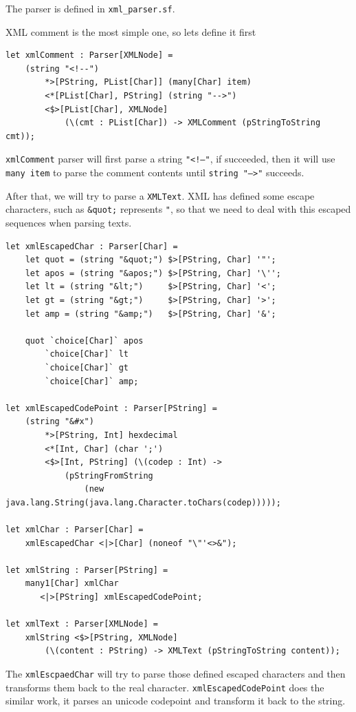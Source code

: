 The parser is defined in \texttt{xml\_parser.sf}.

XML comment is the most simple one, so lets define it first

\begin{lstlisting}
let xmlComment : Parser[XMLNode] =
    (string "<!--")
        *>[PString, PList[Char]] (many[Char] item)
        <*[PList[Char], PString] (string "-->")
        <$>[PList[Char], XMLNode]
            (\(cmt : PList[Char]) -> XMLComment (pStringToString cmt));
\end{lstlisting}

\texttt{xmlComment} parser will first parse a string \texttt{"\textless!--"}, if succeeded, then it will use \texttt{many item} to parse the comment contents until \texttt{string "--\textgreater"} succeeds.

After that, we will try to parse a \texttt{XMLText}. XML has defined some escape characters, such as \texttt{\&quot;} represents \texttt{"}, so that we need to deal with this escaped sequences when parsing texts.

\begin{lstlisting}
let xmlEscapedChar : Parser[Char] =
    let quot = (string "&quot;") $>[PString, Char] '"';
    let apos = (string "&apos;") $>[PString, Char] '\'';
    let lt = (string "&lt;")     $>[PString, Char] '<';
    let gt = (string "&gt;")     $>[PString, Char] '>';
    let amp = (string "&amp;")   $>[PString, Char] '&';

    quot `choice[Char]` apos
        `choice[Char]` lt
        `choice[Char]` gt
        `choice[Char]` amp;

let xmlEscapedCodePoint : Parser[PString] =
    (string "&#x")
        *>[PString, Int] hexdecimal
        <*[Int, Char] (char ';')
        <$>[Int, PString] (\(codep : Int) ->
            (pStringFromString
                (new java.lang.String(java.lang.Character.toChars(codep)))));

let xmlChar : Parser[Char] =
    xmlEscapedChar <|>[Char] (noneof "\"'<>&");

let xmlString : Parser[PString] =
    many1[Char] xmlChar
       <|>[PString] xmlEscapedCodePoint;

let xmlText : Parser[XMLNode] =
    xmlString <$>[PString, XMLNode]
        (\(content : PString) -> XMLText (pStringToString content));
\end{lstlisting}

The \texttt{xmlEscpaedChar} will try to parse those defined escaped characters and then transforms them back to the real character. \texttt{xmlEscapedCodePoint} does the similar work, it parses an unicode codepoint and transform it back to the string.

